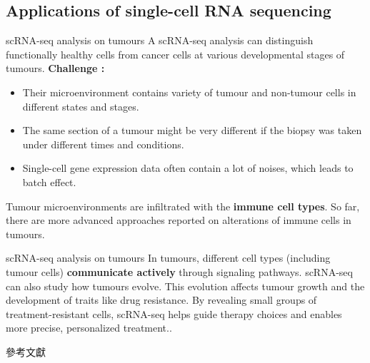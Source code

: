 \documentclass[12pt, aspectratio=43]{beamer}
\begin{document}
\subsection{Applications of single-cell RNA sequencing}
\begin{frame}{scRNA-seq analysis on tumours}
	 A scRNA-seq analysis can distinguish functionally healthy cells from cancer cells at various developmental stages of tumours.
	 \textbf{Challenge :}
	 \begin{itemize}
	 	\item Their microenvironment contains variety of tumour and non-tumour cells in different states and stages. 
	 	\item The same section of a tumour might be very different if the biopsy was taken under different times and conditions.
	 	\item Single-cell gene expression data often contain a lot of noises, which leads to batch effect.
	 \end{itemize}
	 Tumour microenvironments are infiltrated with the \textbf{immune cell types}. So far, there are more advanced approaches reported on alterations of immune cells in tumours.
\end{frame}

\begin{frame}{scRNA-seq analysis on tumours}
	In tumours, different cell types (including tumour cells) \textbf{communicate actively} through signaling pathways.
	\vskip 0.2cm
	scRNA-seq can also study how tumours evolve. This evolution affects tumour growth and the development of traits like drug resistance. 
	\vskip 0.2cm
	By revealing small groups of treatment-resistant cells, scRNA-seq helps guide therapy choices and enables more precise, personalized treatment..
\end{frame}





\begin{frame}[allowframebreaks]{參考文獻}
    \printbibliography %
\end{frame}
\end{document}
